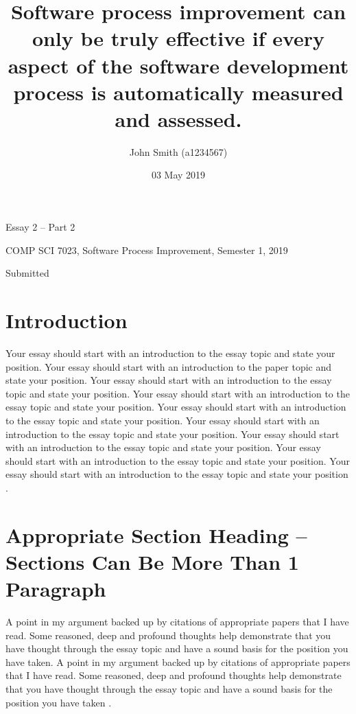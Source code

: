 \documentclass[12pt]{article}
\title{Software process improvement can only be truly effective if every aspect of the software development process is automatically measured and assessed.}
\author{John Smith (a1234567)}
\date{03 May 2019}
\newcommand{\subtitle}{Essay 2 – Part 2}
\begin{document}

\thispagestyle{empty}
\begin{center}
\begingroup
    \fontsize{14pt}{22pt}\selectfont
    \setlength{\parskip}{2em}
    
    
    \vspace*{1cm}
    
    \theauthor
    
    \thetitle
    
    \subtitle
    
    COMP SCI 7023, Software Process Improvement, Semester 1, 2019
    
    Submitted \thedate
    
    
\endgroup
\end{center}

\newpage
\setlength{\parskip}{1em}

\section{Introduction}
Your essay should start with an introduction to the essay topic and state your position. Your essay should start with an introduction to the paper topic and state your position. Your essay should start with an introduction to the essay topic and state your position. Your essay should start with an introduction to the essay topic and state your position. Your essay should start with an introduction to the essay topic and state your position. Your essay should start with an introduction to the essay topic and state your position. Your essay should start with an introduction to the essay topic and state your position. Your essay should start with an introduction to the essay topic and state your position. Your essay should start with an introduction to the essay topic and state your position \cite{Humphrey:2005}.

\section{Appropriate Section Heading – Sections Can Be More Than 1 Paragraph}
A point in my argument backed up by citations of appropriate papers that I have read. Some reasoned, deep and profound thoughts help demonstrate that you have thought through the essay topic and have a sound basis for the position you have taken. A point in my argument backed up by citations of appropriate papers that I have read. Some reasoned, deep and profound thoughts help demonstrate that you have thought through the essay topic and have a sound basis for the position you have taken \cite{Humphrey:2000}. 
\end{document}
